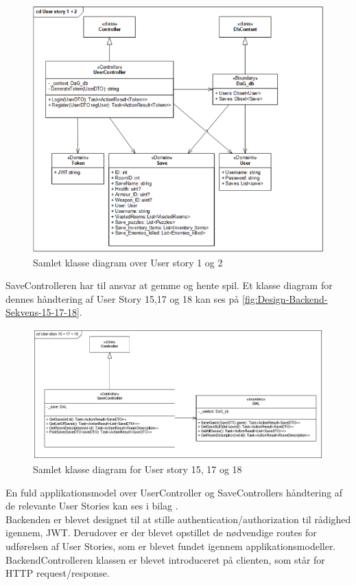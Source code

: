 \begin{figure}[H]
\centering
\includegraphics[width = \textwidth]{02-Body/Images/Backend_klasse_1_2.PNG}
\caption{Samlet klasse diagram over User story 1 og 2}
\label{fig:Design-Backend-Klasse-1-2}
\end{figure}

\noindent SaveControlleren har til ansvar at gemme og hente spil. Et klasse diagram for dennes håndtering af User Story 15,17 og 18 kan ses på \autoref{fig:Design-Backend-Sekvens-15-17-18}.\\


\begin{figure}[H]
\centering
\includegraphics[width = \textwidth]{02-Body/Images/Backend_klasse_15_17_18.PNG}
\caption{Samlet klasse diagram for User story 15, 17 og 18}
\label{fig:Design-Backend-Sekvens-15-17-18}
\end{figure}

\noindent En fuld applikationsmodel over UserController og SaveControllers håndtering af de relevante User Stories kan ses i bilag \parencite[][Section 10]{TekniskBilag}.\\

Backenden er blevet designet til at stille authentication/authorization til rådighed igennem, JWT. 
Derudover er der blevet opstillet de nødvendige routes for udførelsen af User Stories, som
er blevet fundet igennem applikationsmodeller. BackendControlleren klassen er blevet introduceret 
på clienten, som står for HTTP request/response.\\ 

\newpage
